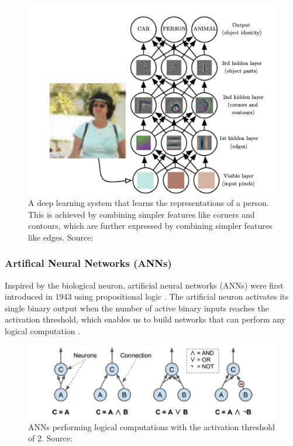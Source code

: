 \documentclass[a4paper,11pt,oneside]{article}
\begin{document}
  \begin{figure}[ht]
    \begin{center}
      \includegraphics[width=.8\textwidth]{deep_learning.png}
    \end{center}
    \caption{A deep learning system that learns the representations of a person. This is achieved by combining simpler
    features like corners and contours, which are further expressed by combining simpler features like edges. Source:
    \cite{goodfellow2016deep}}
  \end{figure}

  \subsubsection{Artifical Neural Networks (ANNs)}

  Inspired by the biological neuron, artificial neural networks (ANNs) were first introduced in 1943 using propositional
  logic \cite{mcculloch1943logical}. The artificial neuron activates its single binary output when the number of active
  binary inputs reaches the activation threshold, which enables us to build networks that can perform any logical
  computation \cite{geron2019hands, mcculloch1943logical}.

  \begin{figure}[ht]
    \begin{center}
      \includegraphics[width=.8\textwidth]{ann_logic_computations.png}
    \end{center}
    \caption{ANNs performing logical computations with the activation threshold of 2. Source: \cite{geron2019hands}}
  \end{figure}
\end{document}
